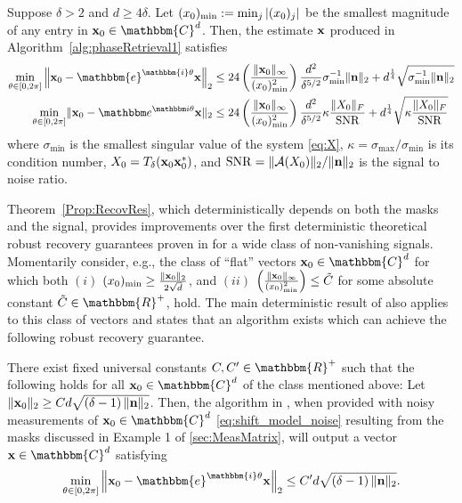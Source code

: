 \begin{theorem}
Suppose $\delta > 2$ and $d \ge 4 \delta$.  Let $(x_0)_{\rm min} := \min_j |(x_0)_j|$ be the smallest magnitude of any entry in $\x_0 \in \mathbbm{C}^d$.  Then, the estimate $\mathbf x$ produced in Algorithm~\ref{alg:phaseRetrieval1} satisfies 
\[\begin{aligned}
\min_{\theta \in [0, 2 \pi]} \left\Vert  \x_0 - \mathbbm{e}^{\mathbbm{i} \theta} \x \right\Vert_2 &\leq 24 \left( \frac{\Vert \x_0 \Vert_{\infty}}{(x_0)^2_{\rm min}} \right) \frac{d^2}{\delta^{5/2}} \sigma_{\min}^{-1} \| \n \|_2 + d^{\frac{1}{4}} \sqrt{\sigma_{\min}^{-1} \| \n \|_2 } \\
\mintheta \norm{\x_0 - \eit \x}_2 &\le 24 \left(\dfrac{\norm{\x_0}_\infty}{(x_0)^2_{\min}}\right)\dfrac{d^2}{\delta^{5/2}} \kappa \frac{\norm{X_0}_F}{\SNR} + d^{\frac{1}{4}} \sqrt{\kappa \frac{\norm{X_0}_F}{\SNR}}
\end{aligned}
\]
where $\sigma_{\min}$ is the smallest singular value of the system \eqref{eq:X}, $\kappa = \sigma_{\max} / \sigma_{\min}$ is its condition number, $X_0 = T_\delta(\mathbf x_0 \mathbf x_0^*)$, and $\operatorname{SNR} = \lVert\mathcal{A}(X_0)\rVert_2 / \lVert\mathbf n\rVert_2$ is the signal to noise ratio.
\label{Prop:RecovRes}
\end{theorem}

Theorem~\ref{Prop:RecovRes}, which deterministically depends on both the masks and the signal, provides improvements over the first deterministic theoretical robust recovery guarantees proven in \cite{IVW2015_FastPhase} for a wide class of non-vanishing signals.  Momentarily consider, e.g., the class of ``flat'' vectors $\x_0 \in \mathbbm{C}^d$ for which both $(i)$ $(x_0)_{\rm min} \geq \frac{\| \mathbf x_0 \|_2}{2 \sqrt{d}}$, and $(ii)$ $\left( \frac{\Vert \mathbf x_0 \Vert_{\infty}}{(x_0)^2_{\rm min}} \right) \leq \tilde{C}$ for some absolute constant $\tilde{C} \in \mathbbm{R}^+$, hold.  The main deterministic result of \cite{IVW2015_FastPhase} also applies to this class of vectors and states that an algorithm exists which can achieve the following robust recovery guarantee.

\begin{theorem} \label{Thm:OLDRecovRes}
There exist fixed universal constants $C,C' \in \mathbbm{R}^+$ such that the following holds for all $\x_0 \in \mathbbm{C}^d$ of the class mentioned above:  Let $\| \mathbf x_0 \|_2 \geq C d  \sqrt{\left(\delta - 1 \right)\| \mathbf n \|_2}$.  Then, the  algorithm in \cite{IVW2015_FastPhase}, when provided with noisy measurements of $\x_0 \in \mathbbm{C}^d$ \eqref{eq:shift_model_noise} resulting from the masks discussed in Example 1 of \cref{sec:MeasMatrix}, will output a vector  $\x \in \mathbbm{C}^d$ satisfying \[ \min_{\theta \in [0, 2 \pi]} \left\Vert  \x_0 - \mathbbm{e}^{\mathbbm{i} \theta} \x \right\Vert_2 \leq C' d  \sqrt{\left(\delta - 1 \right)\| \n \|_2 }.\]
\end{theorem}

